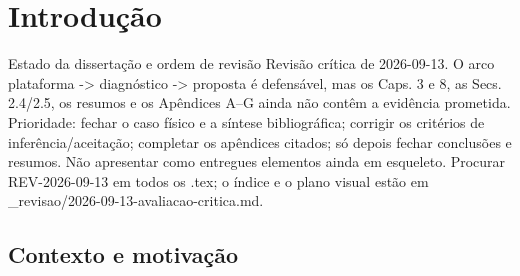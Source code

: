 
\chapter{Introdução}
\label{cha:introducao}
{Estado da dissertação e ordem de revisão}
{Revisão crítica de 2026-09-13. O arco plataforma -\textgreater{} diagnóstico -\textgreater{} proposta
é defensável, mas os Caps. 3 e 8, as Secs. 2.4/2.5, os resumos e os
Apêndices A--G ainda não contêm a evidência prometida. Prioridade: fechar
o caso físico e a síntese bibliográfica; corrigir os critérios de
inferência/aceitação; completar os apêndices citados; só depois fechar
conclusões e resumos. Não apresentar como entregues elementos ainda em
esqueleto. Procurar REV-2026-09-13 em todos os .tex; o índice e o plano
visual estão em \_revisao/2026-09-13-avaliacao-critica.md.}%

\section{Contexto e motivação}
\label{sec:contexto}

